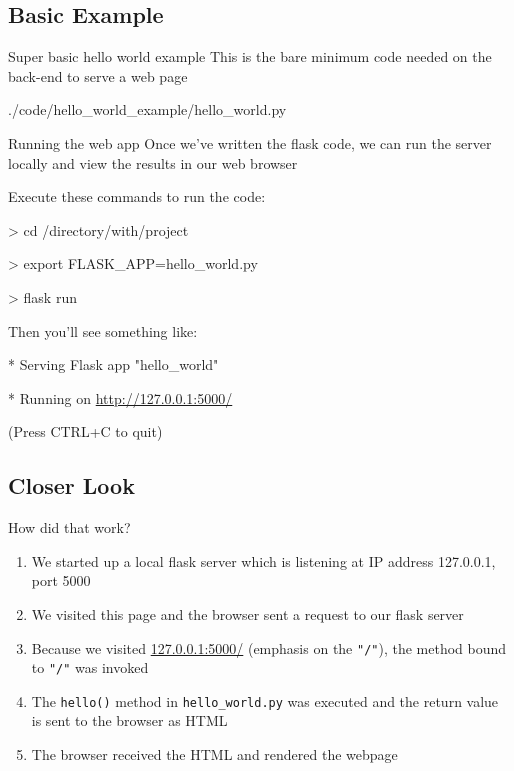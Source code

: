 \documentclass{beamer}
\begin{document}
\subsection{Basic Example}
	\begin{frame}[t]{Super basic hello world example}
		This is the bare minimum code needed on the back-end to serve a web
		page
		\begin{block}{./code/hello\_world\_example/hello\_world.py}
			
		\end{block}
	\end{frame}


	\begin{frame}[t]{Running the web app}
		Once we've written the flask code, we can run the server locally and
		view the results in our web browser
		\pause

		\begin{block}{Execute these commands to run the code:}
			\begin{semiverbatim}
				> cd /directory/with/project

				> export FLASK\_APP=hello\_world.py

				> flask run
			\end{semiverbatim}
		\end{block}
		\pause

		\begin{block}{Then you'll see something like:}
			\begin{semiverbatim}
				* Serving Flask app "hello\_world"

				* Running on \url{http://127.0.0.1:5000/}

					(Press CTRL+C to quit)
			\end{semiverbatim}
		\end{block}
	\end{frame}

\subsection{Closer Look}
	\begin{frame}[t]{How did that work?}
		\begin{enumerate}
			\item{We started up a local flask server which is listening at
					IP address 127.0.0.1, port 5000}
			\pause
			\item{We visited this page and the browser sent a request to our
					flask server}
			\pause
			\item{Because we visited \url{127.0.0.1:5000/} (emphasis on the
					\texttt{"/"}), the method bound to \texttt{"/"} was invoked}
			\pause
			\item{The \texttt{hello()} method in \texttt{hello\_world.py} was
					executed and the return value is sent to the browser as
					HTML}
			\pause
			\item{The browser received the HTML and rendered the webpage}
		\end{enumerate}
	\end{frame}
\end{document}
